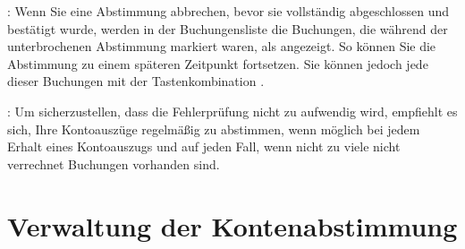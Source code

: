 \Note{}: Wenn Sie eine Abstimmung abbrechen, bevor sie vollständig abgeschlossen und bestätigt wurde, werden in der Buchungensliste die Buchungen, die während der unterbrochenen Abstimmung markiert waren, als  angezeigt. So können Sie die Abstimmung zu einem späteren Zeitpunkt fortsetzen. Sie können jedoch jede dieser Buchungen mit der Tastenkombination  .

\Note{}: Um sicherzustellen, dass die Fehlerprüfung nicht zu aufwendig wird, empfiehlt es sich, Ihre Kontoauszüge regelmäßig zu abstimmen, wenn möglich bei jedem Erhalt eines Kontoauszugs und auf jeden Fall, wenn nicht zu viele nicht verrechnet Buchungen vorhanden sind.


\section{Verwaltung der Kontenabstimmung\label{reconciliation-manage}}

